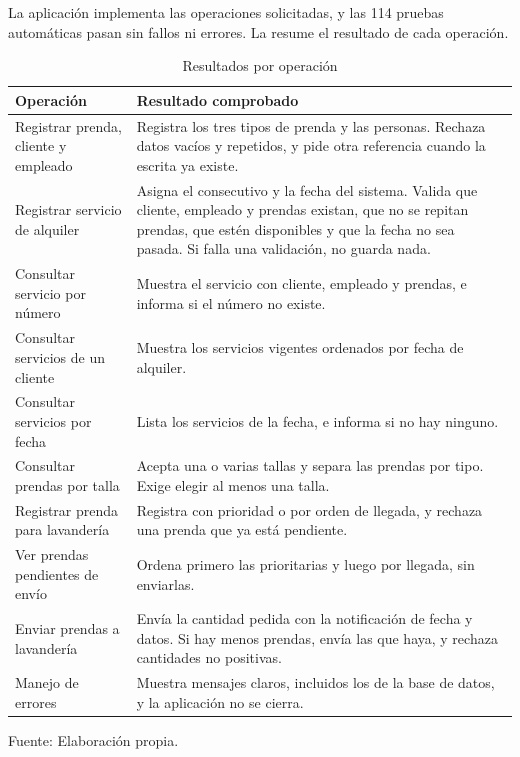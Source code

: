 %
%

La aplicación implementa las operaciones solicitadas, y las 114 pruebas automáticas pasan sin fallos ni errores. La  resume el resultado de cada operación.

\begin{table}[H]
\centering
\caption{Resultados por operación}
\label{tab:resultados}
\small
\renewcommand{\arraystretch}{1.25}
\begin{tabularx}{\textwidth}{@{}p{4.3cm}X@{}}
\toprule
Operación & Resultado comprobado \\
\midrule
Registrar prenda, cliente y empleado & Registra los tres tipos de prenda y las personas. Rechaza datos vacíos y repetidos, y pide otra referencia cuando la escrita ya existe. \\
\addlinespace
Registrar servicio de alquiler & Asigna el consecutivo y la fecha del sistema. Valida que cliente, empleado y prendas existan, que no se repitan prendas, que estén disponibles y que la fecha no sea pasada. Si falla una validación, no guarda nada. \\
\addlinespace
Consultar servicio por número & Muestra el servicio con cliente, empleado y prendas, e informa si el número no existe. \\
\addlinespace
Consultar servicios de un cliente & Muestra los servicios vigentes ordenados por fecha de alquiler. \\
\addlinespace
Consultar servicios por fecha & Lista los servicios de la fecha, e informa si no hay ninguno. \\
\addlinespace
Consultar prendas por talla & Acepta una o varias tallas y separa las prendas por tipo. Exige elegir al menos una talla. \\
\addlinespace
Registrar prenda para lavandería & Registra con prioridad o por orden de llegada, y rechaza una prenda que ya está pendiente. \\
\addlinespace
Ver prendas pendientes de envío & Ordena primero las prioritarias y luego por llegada, sin enviarlas. \\
\addlinespace
Enviar prendas a lavandería & Envía la cantidad pedida con la notificación de fecha y datos. Si hay menos prendas, envía las que haya, y rechaza cantidades no positivas. \\
\addlinespace
Manejo de errores & Muestra mensajes claros, incluidos los de la base de datos, y la aplicación no se cierra. \\
\bottomrule
\end{tabularx}
\par\vspace{4pt}
{\footnotesize Fuente: Elaboración propia.}
\end{table}

